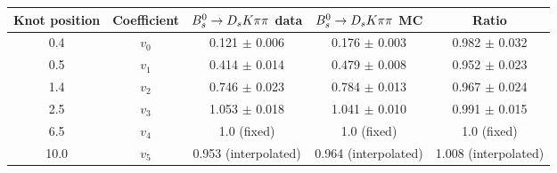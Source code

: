 \begin{tabular}{c c c c c}
\hline
\hline
Knot position & Coefficient & ${{B}^0_{s}}\rightarrow{\ensuremath{{D}_{s}}}{\ensuremath{K}}{\ensuremath{\pi}}{\ensuremath{\pi}}$ data & ${{B}^0_{s}}\rightarrow{\ensuremath{{D}_{s}}}{\ensuremath{K}}{\ensuremath{\pi}}{\ensuremath{\pi}}$ MC & Ratio \\
\hline
0.4 & $v_{0}$ & 0.121 $\pm$ 0.006 & 0.176 $\pm$ 0.003 & 0.982 $\pm$ 0.032\\
0.5 & $v_{1}$ & 0.414 $\pm$ 0.014 & 0.479 $\pm$ 0.008 & 0.952 $\pm$ 0.023\\
1.4 & $v_{2}$ & 0.746 $\pm$ 0.023 & 0.784 $\pm$ 0.013 & 0.967 $\pm$ 0.024\\
2.5 & $v_{3}$ & 1.053 $\pm$ 0.018 & 1.041 $\pm$ 0.010 & 0.991 $\pm$ 0.015\\
6.5 & $v_{4}$ &  1.0 (fixed) & 1.0 (fixed) & 1.0 (fixed)\\
10.0 & $v_{5}$ & 0.953 (interpolated) & 0.964 (interpolated) & 1.008 (interpolated) \\
\hline
\hline
\end{tabular}
